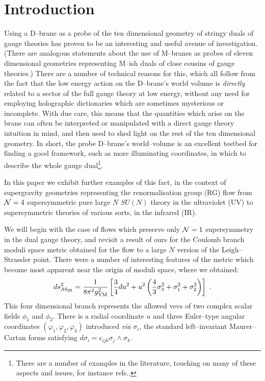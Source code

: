 \documentclass[a4paper,12pt]{article}
\newcommand{\labell}[1]{\label{#1}}
\begin{document}
  
\section{Introduction}
 
Using a D--brane as a probe of the ten dimensional geometry of stringy
duals\cite{malda, gkp, w1} of gauge theories has proven to be an
interesting and useful avenue of investigation. (There are analogous
statements about the use of M--branes as probes of eleven dimensional
geometries representing M--ish duals of close cousins of gauge
theories.)  There are a number of technical reasons for this, which
all follow from the fact that the low energy action on the D--brane's
world volume is {\it directly} related to a sector of the full gauge
theory at low energy, without any need for employing holographic
dictionaries which are sometimes mysterious or incomplete.  With due
care, this means that the quantities which arise on the brane can
often be interpreted or manipulated with a direct gauge theory
intuition in mind, and then used to shed light on the rest of the ten
dimensional geometry. In short, the probe D--brane's world--volume is
an excellent testbed for finding a good framework, such as more
illuminating coordinates, in which to describe the whole gauge
dual\footnote{There are a number of examples in the literature,
  touching on many of these aspects and issues, for instance
  refs.\cite{bpp,ejp,beh,primer}.}.

In this paper we exhibit further examples of this fact, in the context
of supergravity geometries representing the renormalisation group (RG)
flow\cite{gppz1, dz1} from ${\cal N}=4$ supersymmetric pure large $N$
$SU(N)$ theory in the ultraviolet (UV) to
supersymmetric theories of various sorts, in the infrared (IR).
 

We will begin with the case of flows which preserve only ${\cal N}=1$
supersymmetry in the dual gauge theory, and revisit a result of
ours\cite{jlp} for the Coulomb branch moduli space metric obtained for
the flow\cite{freed1,pw2} to a large $N$ version of the
Leigh--Strassler point\cite{pilch,robmatt,lsflow}. There were a number of
interesting features of the metric which become most apparent near the
origin of moduli space, where we obtained:
\begin{equation}
ds^2_{{\cal M}_{\rm IR}}={1\over 8\pi^2 g_{\rm YM}^2}\left[{3\over4} du^2+
 u^2\left({4\over 3}\sigma_3^2+
{\sigma_1^2+\sigma_2^2}\right)\right]\ .
\labell{stretched}
\end{equation}
This four dimensional branch represents the allowed vevs of two
complex scalar fields $\phi_1$ and $\phi_2$.  There is a radial
coordinate $u$ and three Euler--type angular coordinates
$(\varphi_1,\varphi_2,\varphi_3)$ introduced {\it via} $\sigma_i$, the
standard left--invariant Maurer--Cartan forms satisfying
$d\sigma_i=\epsilon_{ijk}\sigma_j\wedge\sigma_k$.
\end{document}
